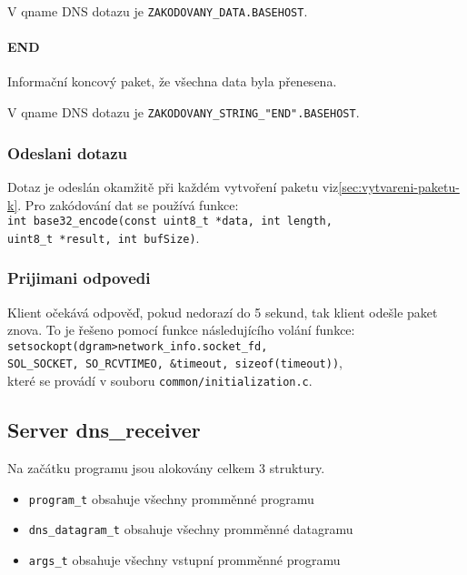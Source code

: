 V qname DNS dotazu je \texttt{ZAKODOVANY\_DATA.BASEHOST}.

\paragraph{END}
Informační koncový paket, že všechna data byla přenesena.

V qname DNS dotazu je \texttt{ZAKODOVANY\_STRING\_"END".BASEHOST}.

\subsubsection{Odeslani dotazu} \label{sec:odeslani-dotazu-k}
Dotaz je odeslán okamžitě při každém vytvoření paketu viz\ref{sec:vytvareni-paketu-k}.
Pro zakódování dat se používá funkce: \\
\texttt{int base32\_encode(const uint8\_t *data, int length, \\
uint8\_t *result, int bufSize)}\cite{encodingData}.

\subsubsection{Prijimani odpovedi}\label{sec:prijimani-odpovedi-k}
Klient očekává odpověď, pokud nedorazí do 5 sekund, tak klient odešle paket znova.
To je řešeno pomocí funkce následujícího volání funkce:
\texttt{setsockopt(dgram\->network\_info.socket\_fd, \\
    SOL\_SOCKET, SO\_RCVTIMEO, \&timeout, sizeof(timeout))},\\
které se provádí v souboru \texttt{common/initialization.c}.



\subsection{Server \- dns\_receiver}

Na začátku programu jsou alokovány celkem 3 struktury.

\begin{itemize}
    \item \texttt{program\_t} \- obsahuje všechny promměnné programu
    \item \texttt{dns\_datagram\_t} \- obsahuje všechny promměnné datagramu
    \item \texttt{args\_t} \- obsahuje všechny vstupní promměnné programu
\end{itemize}

